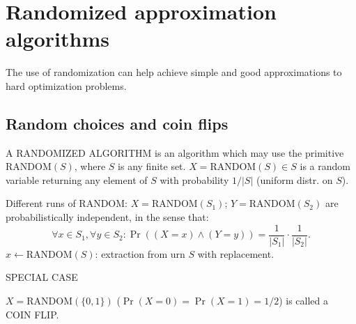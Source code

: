 \section{Randomized approximation algorithms}
The use of randomization can help achieve simple and good approximations to hard optimization problems.
\subsection{Random choices and coin flips}
\begin{notesdefinition}
A RANDOMIZED ALGORITHM is an algorithm which may use the primitive RANDOM$(S)$, where $S$ is any finite set.
$X=\mathrm{RANDOM}(S)\in S$ is a random variable returning any element of $S$ with probability $1/|S|$ (uniform distr. on $S$).
\end{notesdefinition}
Different runs of RANDOM:
$X=\mathrm{RANDOM}(S_1)$; $Y=\mathrm{RANDOM}(S_2)$ are probabilistically independent, in the sense that:
\[\forall x\in S_1,\forall y\in S_2:
\Pr((X=x)\wedge(Y=y))=\frac1{|S_1|}\cdot\frac1{|S_2|}.\]
$x\gets\mathrm{RANDOM}(S)$: extraction from urn $S$ with replacement.
\begin{notesdefinition}
SPECIAL CASE

$X=\mathrm{RANDOM}(\{0,1\})$ ($\Pr(X=0)=\Pr(X=1)=1/2$) is called a COIN FLIP.
\end{notesdefinition}
